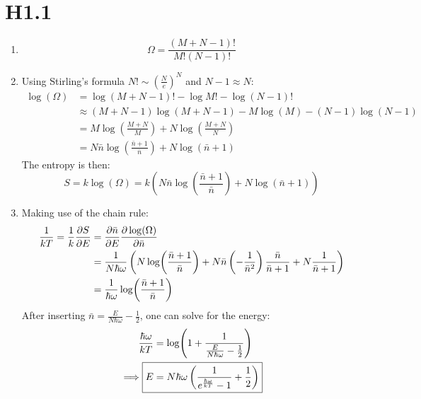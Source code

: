 \documentclass[11pt,a4paper]{scrartcl}
\newcommand{\nbar}{\ensuremath{\bar{n}}}
\begin{document}
\section*{H1.1}

\begin{enumerate}[label=\textbf{\large(\alph*)}, itemsep=2\baselineskip]

\item
    \begin{equation*}
        \Omega = \frac{(M+N-1)!}{M!(N-1)!}
    \end{equation*}

\item
    Using Stirling's formula $N!\sim\left(\frac{N}{e}\right)^N$ and $N-1\approx N$:
    \begin{align*}
        \log(\Omega) &= \log(M+N-1)!-\log M!-\log(N-1)! \\
        &\approx
        (M+N-1)\log(M+N-1)-M\log(M)-(N-1)\log(N-1) \\
        &= M\log(\frac{M+N}{M})+N\log(\frac{M+N}{N}) \\
        &= N\nbar\log(\frac{\nbar+1}{\nbar})+N\log(\nbar+1)
    \end{align*}
    The entropy is then:
    \begin{equation*}
        S = k\log(\Omega)
        = k\left(N\nbar\log(\frac{\nbar+1}{\nbar})+N\log(\nbar+1)\right)
    \end{equation*}

\item
    Making use of the chain rule:
    \begin{align*}
        \frac{1}{kT} = \frac{1}{k}\pdv{S}{E}
        &= \pdv{\nbar}{E}\pdv{\log(\Omega)}{\nbar} \\
        &= \frac{1}{N\hbar\omega}\left(N\log(\frac{\nbar+1}{\nbar})
        +N\nbar\left(-\frac{1}{\nbar^2}\right)\frac{\nbar}{\nbar+1}
        +N\frac{1}{\nbar+1}\right)\\
        &= \frac{1}{\hbar\omega}\log(\frac{\nbar+1}{\nbar})
    \end{align*}
    After inserting $\nbar=\frac{E}{N\hbar\omega}-\frac{1}{2}$, one can solve
    for the energy:
    \begin{align*}
        \frac{\hbar\omega}{kT} &=
        \log(1+\frac{1}{\frac{E}{N\hbar\omega}-\frac{1}{2}}) \\
        \implies \Aboxed{%
            E &=
            N\hbar\omega\left(\frac{1}{e^{\frac{\hbar\omega}{kT}}-1}+\frac{1}{2}\right)
        }
    \end{align*}

\end{enumerate}
\end{document}
